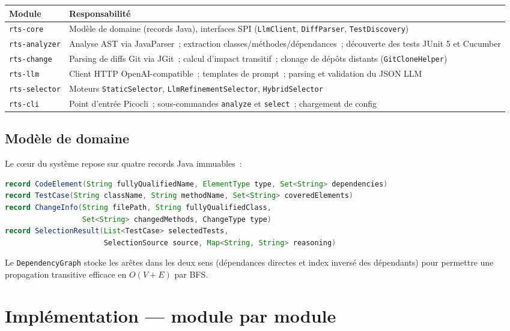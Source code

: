\documentclass[12pt,a4paper]{article}
\begin{document}
\begin{tabularx}{\linewidth}{lX}
\toprule
\textbf{Module} & \textbf{Responsabilité} \\
\midrule
\texttt{rts-core}     & Modèle de domaine (records Java), interfaces SPI (\texttt{LlmClient}, \texttt{DiffParser}, \texttt{TestDiscovery}) \\
\texttt{rts-analyzer} & Analyse AST via JavaParser~; extraction classes/méthodes/dépendances~; découverte des tests JUnit 5 et Cucumber \\
\texttt{rts-change}   & Parsing de diffs Git via JGit~; calcul d'impact transitif~; clonage de dépôts distants (\texttt{GitCloneHelper}) \\
\texttt{rts-llm}      & Client HTTP OpenAI-compatible~; templates de prompt~; parsing et validation du JSON LLM \\
\texttt{rts-selector} & Moteurs \texttt{StaticSelector}, \texttt{LlmRefinementSelector}, \texttt{HybridSelector} \\
\texttt{rts-cli}      & Point d'entrée Picocli~; sous-commandes \texttt{analyze} et \texttt{select}~; chargement de config \\
\bottomrule
\end{tabularx}

\subsection{Modèle de domaine}

Le cœur du système repose sur quatre records Java immuables~:

\begin{lstlisting}[language=Java]
record CodeElement(String fullyQualifiedName, ElementType type, Set<String> dependencies)
record TestCase(String className, String methodName, Set<String> coveredElements)
record ChangeInfo(String filePath, String fullyQualifiedClass,
                  Set<String> changedMethods, ChangeType type)
record SelectionResult(List<TestCase> selectedTests,
                       SelectionSource source, Map<String, String> reasoning)
\end{lstlisting}

Le \texttt{DependencyGraph} stocke les arêtes dans les deux sens (dépendances
directes et index inversé des dépendants) pour permettre une propagation
transitive efficace en $O(V + E)$ par BFS.

\section{Implémentation — module par module}
\end{document}
